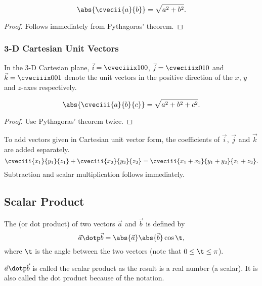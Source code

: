 \begin{proposition}[Magnitude in 2-D]
    \[\abs{\cvecii{a}{b}} = \sqrt{a^2 + b^2}.\]
\end{proposition}
\begin{proof}
    Follows immediately from Pythagoras' theorem.
\end{proof}

\subsubsection{3-D Cartesian Unit Vectors}

\begin{definition}
    In the 3-D Cartesian plane, $\vec i = \cveciiix100$, $\vec j = \cveciiix010$ and $\vec k = \cveciiix001$ denote the unit vectors in the positive direction of the $x$, $y$ and $z$-axes respectively.
\end{definition}

\begin{proposition}[Magnitude in 3-D]
    \[\abs{\cveciii{a}{b}{c}} = \sqrt{a^2 + b^2 + c^2}.\]
\end{proposition}
\begin{proof}
    Use Pythagoras' theorem twice.
\end{proof}

\begin{fact}
    To add vectors given in Cartesian unit vector form, the coefficients of $\vec i$, $\vec j$ and $\vec k$ are added separately. \[\cveciii{x_1}{y_1}{z_1} + \cveciii{x_2}{y_2}{z_2} = \cveciii{x_1+x_2}{y_1+y_2}{z_1+z_2}.\] Subtraction and scalar multiplication follows immediately.
\end{fact}

\clearpage
\subsection{Scalar Product}

\begin{definition}
    The  (or dot product) of two vectors $\vec a$ and $\vec b$ is defined by \[\vec a \dotp \vec b = \abs{\vec a} \abs{\vec b} \cos \t,\] where $\t$ is the angle between the two vectors (note that $0 \leq \t \leq \pi$).
\end{definition}
\begin{remark}
    $\vec a \dotp \vec b$ is called the scalar product as the result is a real number (a scalar). It is also called the dot product because of the notation.
\end{remark}

